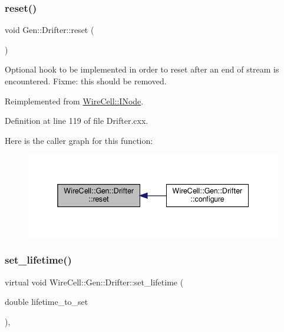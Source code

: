 \mbox{\label{class_wire_cell_1_1_gen_1_1_drifter_a50935de34f9dd1171d76201b6081e9d7}} 
\subsubsection{\texorpdfstring{reset()}{reset()}}
{\footnotesize\ttfamily void Gen\+::\+Drifter\+::reset (\begin{DoxyParamCaption}{ }\end{DoxyParamCaption})\hspace{0.3cm}{\ttfamily [virtual]}}

Optional hook to be implemented in order to reset after an end of stream is encountered. Fixme\+: this should be removed. 

Reimplemented from \hyperlink{class_wire_cell_1_1_i_node_a7bf4dfff146b72f866ab25f7662c56a0}{Wire\+Cell\+::\+I\+Node}.



Definition at line 119 of file Drifter.\+cxx.

Here is the caller graph for this function\+:
\nopagebreak
\begin{figure}[H]
\begin{center}
\leavevmode
\includegraphics[width=338pt]{class_wire_cell_1_1_gen_1_1_drifter_a50935de34f9dd1171d76201b6081e9d7_icgraph}
\end{center}
\end{figure}
\mbox{\label{class_wire_cell_1_1_gen_1_1_drifter_a6ddb93888f24726d2e261a328c1b4164}} 
\subsubsection{\texorpdfstring{set\+\_\+lifetime()}{set\_lifetime()}}
{\footnotesize\ttfamily virtual void Wire\+Cell\+::\+Gen\+::\+Drifter\+::set\+\_\+lifetime (\begin{DoxyParamCaption}\item[{double}]{lifetime\+\_\+to\+\_\+set }\end{DoxyParamCaption})\hspace{0.3cm}{\ttfamily [inline]}, {\ttfamily [virtual]}}




